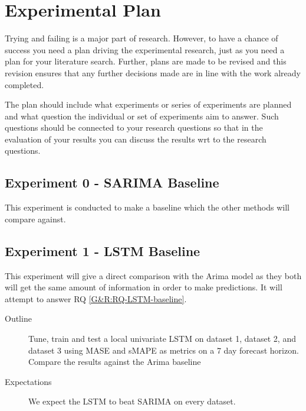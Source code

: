 
\section{Experimental Plan}
\label{sec:experimentalPlan}

Trying and failing is a major part of research. However, to have a chance of success you need a plan driving the experimental research, just as you need a plan for your literature search. Further, plans are made to be revised and this revision ensures that any further decisions made are in line with the work already completed.

The plan should include what experiments or series of experiments are planned and what question the individual or set of experiments aim to answer. Such questions should be connected to your research questions so that in the evaluation of your results you can discuss the results wrt to the research questions.



\subsection{Experiment 0 - SARIMA Baseline}
This experiment is conducted to make a baseline which the other methods
will compare against.

\subsection{Experiment 1 - LSTM Baseline}
This experiment will give a direct comparison with the Arima model as they both will
get the same amount of information in order to make predictions.
It will attempt to answer RQ \cref{G&R:RQ-LSTM-baseline}.

\begin{description}
  \item[Outline]{Tune, train and test a local univariate LSTM on dataset 1,
              dataset 2, and dataset 3 using MASE and sMAPE as metrics on a 7 day forecast horizon. Compare the results against the Arima baseline}
\end{description}

\begin{description}
  \item[Expectations]{We expect the LSTM to beat SARIMA on every dataset.}
\end{description}

